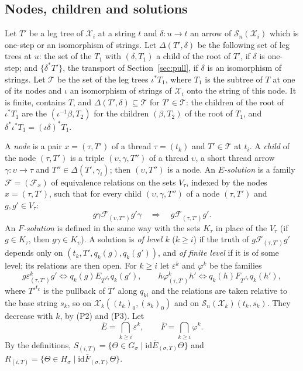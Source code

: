 \documentclass[11pt]{amsart}
\theoremstyle{definition}
\newcommand{\cX}{\mathcal X}
\newcommand{\cS}{\mathcal S}
\newcommand{\id}{\mathrm{id}}
\begin{document}
\subsection*{Nodes, children and solutions}
Let $T'$ be a leg tree of $\cX_i$ at a string $t$ and $\delta\colon
u\to t$ an arrow of $\cS_n(\cX_i)$ which is one-step or an
isomorphism of strings. Let $\Delta(T',\delta)$ be the following set
of leg trees at $u$: the set of the $T_1$ with $(\delta,T_1)$ a child
of the root of $T'$, if $\delta$ is one-step; and $\{\delta^*T'\}$,
the transport of Section~\ref{sec:pull}, if $\delta$ is an
isomorphism of strings. Let $\mathcal T$ be the set of the leg trees
$\iota^*T_1$, where $T_1$ is the subtree of $T$ at one of its nodes
and $\iota$ an isomorphism of strings of $\cX_i$ onto the string of
this node. It is finite, contains $T$, and $\Delta(T',\delta)\subseteq
\mathcal T$ for $T'\in\mathcal T$: the children of the root of
$\iota^*T_1$ are the $(\iota^{-1}\beta,T_2)$ for the children
$(\beta,T_2)$ of the root of $T_1$, and $\delta^*\iota^*T_1=
(\iota\delta)^*T_1$.

A \emph{node} is a pair $x=(\tau,T')$ of a thread $\tau=(t_k)$ and
$T'\in\mathcal T$ at $t_i$. A \emph{child} of the node $(\tau,T')$ is
a triple $(\upsilon,\gamma,T'')$ of a thread $\upsilon$, a short
thread arrow $\gamma\colon\upsilon\to\tau$ and $T''\in\Delta(T',
\gamma_i)$; then $(\upsilon,T'')$ is a node. An \emph{$E$-solution}
is a family $\mathcal F=(\mathcal F_x)$ of equivalence relations on
the sets $V_\tau$, indexed by the nodes $x=(\tau,T')$, such that for
every child $(\upsilon,\gamma,T'')$ of a node $(\tau,T')$ and
$g,g'\in V_\tau$:
\begin{equation}\label{eq:sol}
g\gamma\mathrel{\mathcal F_{(\upsilon,T'')}}g'\gamma\quad
\Longrightarrow\quad g\mathrel{\mathcal F_{(\tau,T')}}g'.
\end{equation}
An \emph{$F$-solution} is defined in the same way with the sets
$K_\tau$ in place of the $V_\tau$ (if $g\in K_\tau$, then $g\gamma\in
K_\upsilon$). A solution is \emph{of level $k$} ($k\ge i$) if the
truth of $g\mathrel{\mathcal F_{(\tau,T')}}g'$ depends only on
$(t_k,T',q_k(g),q_k(g'))$, and \emph{of finite level} if it is of
some level; its relations are then open. For $k\ge i$ let
$\varepsilon^k$ and $\varphi^k$ be the families
\[
g\mathrel{\varepsilon^k_{(\tau,T')}}g'\iff q_k(g)\mathrel{E_{T'^{t_k}}}
q_k(g'),\qquad
h\mathrel{\varphi^k_{(\tau,T')}}h'\iff q_k(h)\mathrel{F_{T'^{t_k}}}
q_k(h'),
\]
where $T'^{t_k}$ is the pullback of $T'$ along $q_{ki}$ and the
relations are taken relative to the base string $s_k$, so on
$\cX_k((t_k)_0,(s_k)_0)$ and on $\cS_n(\cX_k)(t_k,s_k)$. They
decrease with $k$, by (P2) and (P3). Let
\[
\bar E=\bigcap_{k\ge i}\varepsilon^k,\qquad\bar F=\bigcap_{k\ge i}
\varphi^k .
\]
By the definitions, $S_{(i,T)}=\{\Theta\in G_\sigma\mid\id\mathrel{
\bar E_{(\sigma,T)}}\Theta\}$ and $R_{(i,T)}=\{\Theta\in H_\sigma\mid
\id\mathrel{\bar F_{(\sigma,T)}}\Theta\}$.
\end{document}
